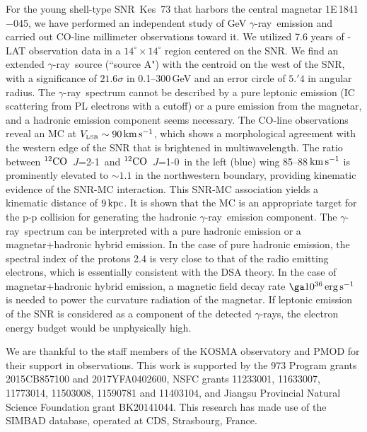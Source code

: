 \documentclass[12pt,preprint]{aastex}
\newcommand{\ssst}{\scriptscriptstyle}
\newcommand{\erg}{\,{\rm erg}}        \newcommand{\K}{\,{\rm K}}
\newcommand{\VLSR}{V_{\ssst\rm LSR}}
\newcommand{\twCO}{$^{12}{\rm CO}$}
\newcommand{\Jotz}{$J$=1-0}
\newcommand{\Jtto}{$J$=2-1}
\newcommand{\gray}{{\rm $\gamma$-ray}}
\begin{document}
For the young shell-type SNR~Kes~73 that harbors the central magnetar 1E\,1841$-$045,
we have performed  an independent study of GeV \gray\ emission
and carried out CO-line millimeter observations toward it.
We utilized 7.6 years of \Fermi-LAT observation data in a
$14^{\circ}\times14^{\circ}$ region centered on the SNR.
We find an extended \gray\ source (``source A") with the centroid
on the west of the SNR, with a significance of $21.6\sigma$
in 0.1--300\,GeV and an error circle of $5.'4$ in angular radius.
The \gray\ spectrum cannot be described by a pure leptonic
emission (IC scattering from PL electrons with a cutoff)
 or a pure emission from the magnetar,
and a hadronic emission component seems necessary.
The CO-line observations reveal an MC at $\VLSR\sim90\km\ps$,
which shows a morphological agreement with the western edge of the SNR
that is brightened in multiwavelength.
The ratio between \twCO\ \Jtto\ and \twCO\ \Jotz\ in the left (blue)
wing 85--88$\,{\rm km}\,{\rm s}^{-1}$
 is prominently elevated to $\sim1.1$ in the northwestern boundary, 
providing  kinematic evidence of the SNR-MC interaction.
This SNR-MC association yields a kinematic  distance  of $9\,{\rm kpc}$.
It is shown that the MC is an appropriate target for the p-p collision
for generating the hadronic \gray\ emission component.
The \gray\ spectrum can be  interpreted with a pure hadronic emission
or a  magnetar+hadronic hybrid emission.
In the case of pure hadronic emission, the spectral index of the
protons 2.4 is very close to that of the radio
emitting electrons, which is essentially consistent with the DSA theory.
 In the case of magnetar+hadronic hybrid emission,
a magnetic field decay rate $\ga10^{36}\erg\ps$
is needed to power the curvature radiation of the magnetar.
If leptonic emission of the SNR is considered as a component
of the detected \gray{s},
the electron energy budget would be unphysically high.

\begin{acknowledgements}
We are thankful to the staff members of the KOSMA observatory
and PMOD for their support in observations.
This work is supported by the 973 Program grants 2015CB857100 and 2017YFA0402600,
 NSFC grants 11233001, 11633007, 11773014, 11503008, 11590781 and 11403104, and
Jiangsu Provincial Natural Science Foundation grant BK20141044.
This research has made use of the SIMBAD database,
operated at CDS, Strasbourg, France.

\end{acknowledgements}
\end{document}
